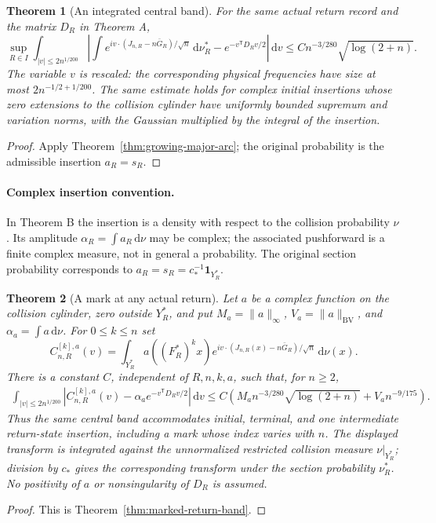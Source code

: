 \documentclass[11pt,reqno]{amsart}
\numberwithin{equation}{section}
\newtheorem{maintheorem}{Theorem}
\theoremstyle{definition}\newtheorem{definition}[theorem]{Definition}
\theoremstyle{remark}\newtheorem{remark}[theorem]{Remark}
\newcommand{\dd}{\,\mathrm d}\newcommand{\one}{\mathbf1}
\begin{document}
\begin{maintheorem}[An integrated central band]
\label{thm:intro-major-arc}
For the same actual return record and the matrix $D_R$ in Theorem A,
\[
 \sup_{R\in I}\int_{|v|\le2n^{1/200}}
 \left|\int e^{iv\cdot(J_{n,R}-n\bar G_R)/\sqrt n}\dd\nu_R^*
                       -e^{-v^{\mathsf T}D_Rv/2}\right|\dd v
       \le Cn^{-3/280}\sqrt{\log(2+n)}.
\]
The variable $v$ is rescaled: the corresponding physical frequencies
have size at most $2n^{-1/2+1/200}$. The same estimate holds for complex
initial insertions whose zero extensions to the collision cylinder
have uniformly bounded supremum and variation norms, with the Gaussian
multiplied by the integral of the insertion.
\end{maintheorem}
\begin{proof}
Apply Theorem~\ref{thm:growing-major-arc}; the original probability is
the admissible insertion $a_R=s_R$.
\end{proof}

\paragraph{Complex insertion convention.}
In Theorem B the insertion is a density with respect to the collision
probability $\nu$. Its amplitude $\alpha_R=\int a_R\dd\nu$ may be
complex; the associated pushforward is a finite complex measure, not
in general a probability. The original section probability corresponds
to $a_R=s_R=c_*^{-1}\one_{Y_R^*}$.

\begin{maintheorem}[A mark at any actual return]
\label{thm:intro-marked-return}
Let $a$ be a complex function on the collision cylinder, zero outside
$Y_R^*$, and put $M_a=\|a\|_\infty$, $V_a=\|a\|_{\mathrm{BV}}$,
and $\alpha_a=\int a\dd\nu$. For $0\le k\le n$ set
\[
 C^{[k],a}_{n,R}(v)=\int_{Y_R^*}a((F_R^*)^k x)
       e^{iv\cdot(J_{n,R}(x)-n\bar G_R)/\sqrt n}\dd\nu(x).
\]
There is a constant $C$, independent of $R,n,k,a$, such that, for $n\ge2$,
\begin{align*}
 \int_{|v|\le2n^{1/200}}
 \left|C^{[k],a}_{n,R}(v)-\alpha_a e^{-v^{\mathsf T}D_Rv/2}\right|\dd v
 \le C\left(M_an^{-3/280}\sqrt{\log(2+n)}+V_an^{-9/175}\right).
\end{align*}
Thus the same central band accommodates initial, terminal, and one
intermediate return-state insertion, including a mark whose index
varies with $n$. The displayed transform is integrated against the
unnormalized restricted collision measure $\nu|_{Y_R^*}$; division by
$c_*$ gives the corresponding transform under the section probability
$\nu_R^*$. No positivity of $a$ or nonsingularity of $D_R$ is assumed.
\end{maintheorem}
\begin{proof}
This is Theorem~\ref{thm:marked-return-band}.
\end{proof}
\end{document}

